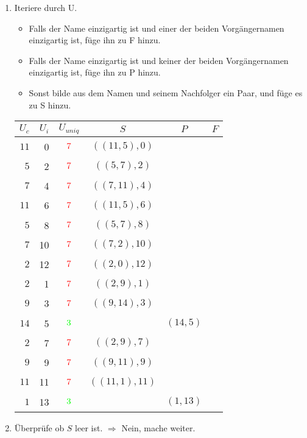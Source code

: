 \begin{enumerate}
\item 
Iteriere durch U.
\begin{itemize}
\item Falls der Name einzigartig ist und einer der beiden Vorgängernamen einzigartig ist, füge ihn zu F hinzu.
\item Falls der Name einzigartig ist und keiner der beiden Vorgängernamen einzigartig ist, füge ihn zu P hinzu.
\item Sonst bilde aus dem Namen und seinem Nachfolger ein Paar, und füge es zu S hinzu.
\end{itemize}

\begin{center}
\small\begin{tabular}{rrcccc}
\toprule 
 $U_c$ & $U_i$ & $U_{uniq}$ &     $S$      &   $P$   &   $F$   \\
\midrule 
$11$ & 0 & $$\xmarkc$$ & $((11, 5), 0)$ &       &       \\
$ 5$ & 2 & $$\xmarkc$$ & $(( 5, 7), 2)$ &       &       \\
$ 7$ & 4 & $$\xmarkc$$ & $(( 7,11), 4)$ &       &       \\
$11$ & 6 & $$\xmarkc$$ & $((11, 5), 6)$ &       &       \\
$ 5$ & 8 & $$\xmarkc$$ & $(( 5, 7), 8)$ &       &       \\
$ 7$ & 10 & $$\xmarkc$$ & $(( 7, 2),10)$ &       &       \\
$ 2$ & 12 & $$\xmarkc$$ & $(( 2, 0),12)$ &       &       \\
$ 2$ & 1 & $$\xmarkc$$ & $(( 2, 9), 1)$ &       &       \\
$ 9$ & 3 & $$\xmarkc$$ & $(( 9,14), 3)$ &       &       \\
$14$ & 5 & $$\cmarkc$$  &            & $(14, 5)$ &       \\
$ 2$ & 7 & $$\xmarkc$$ & $(( 2, 9), 7)$ &       &       \\
$ 9$ & 9 & $$\xmarkc$$ & $(( 9,11), 9)$ &       &       \\
$11$ & 11 & $$\xmarkc$$ & $((11, 1),11)$ &       &       \\
$ 1$ & 13 & $$\cmarkc$$  &            & $( 1,13)$ &       \\
\bottomrule 
\end{tabular}
\end{center}

\item 
Überprüfe ob $S$ leer ist.
$\Rightarrow$ Nein, mache weiter.


\end{enumerate}
